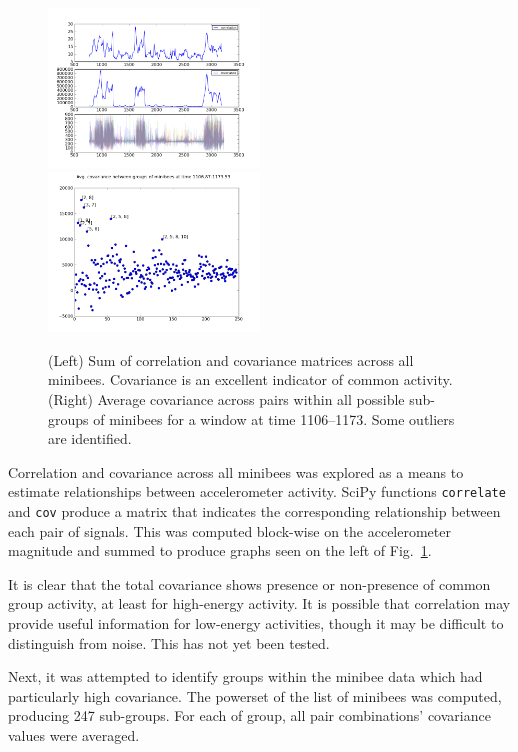\documentclass{article}
\newcommand{\func}[1]{\texttt{#1}}
\begin{document}
\begin{figure}
\includegraphics[width=0.5\textwidth]{images/corr_cov.png}
\includegraphics[width=0.5\textwidth]{images/cov_groups_1106.png}
\caption{(Left) Sum of correlation and covariance matrices across all
  minibees.  Covariance is an excellent indicator of common activity.
  (Right) Average covariance across pairs within all possible
  sub-groups of minibees for a window at time 1106--1173.  Some
  outliers are identified.}
\label{covgroups}
\end{figure}

Correlation and covariance across all minibees was explored as a means
to estimate relationships between accelerometer activity.
SciPy functions \func{correlate} and \func{cov} produce a matrix that
indicates the corresponding relationship between each pair of signals.
This was computed block-wise on the accelerometer magnitude and summed
to produce graphs seen on the left of Fig.~\ref{covgroups}.

It is clear that the total covariance shows presence or non-presence
of common group activity, at least for high-energy activity.
It is possible that correlation may provide useful information for
low-energy activities, though it may be difficult to distinguish from
noise.
This has not yet been tested.

Next, it was attempted to identify groups within the minibee data
which had particularly high covariance.
The powerset of the list of minibees was computed, producing 247
sub-groups.
For each of group, all pair combinations' covariance values were averaged.
\end{document}
